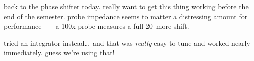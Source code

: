 back to the phase shifter today. really want to get this thing working before
the end of the semester. probe impedance seems to matter a distressing amount
for performance —- a 100x probe measures a full 20\textdegree\ more shift.

tried an integrator instead\ldots\ and that was \emph{really} easy to tune and
worked nearly immediately. guess we're using that!
